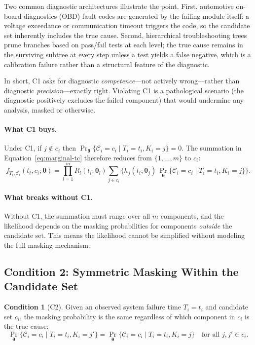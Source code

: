 \documentclass[11pt]{article}
\theoremstyle{definition}
\newtheorem{condition}{Condition}
\theoremstyle{plain}
\renewcommand{\v}[1]{\boldsymbol{#1}}
\newcommand{\btheta}{\v{\theta}}
\begin{document}
Two common diagnostic architectures illustrate the point.
First, automotive on-board diagnostics (OBD) fault codes are generated
by the failing module itself: a voltage exceedance or communication
timeout triggers the code, so the candidate set inherently includes the
true cause.
Second, hierarchical troubleshooting trees prune branches based on
pass/fail tests at each level; the true cause remains in the surviving
subtree at every step unless a test yields a false negative, which is a
calibration failure rather than a structural feature of the diagnostic.

In short, C1 asks for diagnostic \emph{competence}---not actively
wrong---rather than diagnostic \emph{precision}---exactly right.
Violating C1 is a pathological scenario (the diagnostic positively
excludes the failed component) that would undermine any analysis, masked
or otherwise.

\paragraph{What C1 buys.}
Under C1, if $j \notin c_i$ then
$\Pr_{\!\btheta}\{\mathcal{C}_i = c_i \mid T_i = t_i, K_i = j\} = 0$.
The summation in Equation~\eqref{eq:marginal-tc} therefore reduces from
$\{1, \ldots, m\}$ to $c_i$:
\begin{equation}
\label{eq:after-c1}
    f_{T_i, \mathcal{C}_i}(t_i, c_i; \btheta)
    = \prod_{l=1}^m R_l(t_i; \v{\theta}_l)
        \sum_{j \in c_i} \biggl\{
            h_j(t_i; \v{\theta}_j) \,
            \Pr_{\!\btheta}\{\mathcal{C}_i = c_i \mid T_i = t_i, K_i = j\}
        \biggr\}.
\end{equation}

\paragraph{What breaks without C1.}
Without C1, the summation must range over all $m$ components, and the
likelihood depends on the masking probabilities for components
\emph{outside} the candidate set.
This means the likelihood cannot be simplified without modeling the full
masking mechanism.

\subsection{Condition 2: Symmetric Masking Within the Candidate Set}
\label{sec:c2}

\begin{condition}[C2]
\label{cond:c2}
Given an observed system failure time $T_i = t_i$ and candidate set
$c_i$, the masking probability is the same regardless of which component
in $c_i$ is the true cause:
\begin{equation}
    \Pr_{\!\btheta}\{\mathcal{C}_i = c_i \mid T_i = t_i, K_i = j'\}
    = \Pr_{\!\btheta}\{\mathcal{C}_i = c_i \mid T_i = t_i, K_i = j\}
    \quad \text{for all } j, j' \in c_i.
\end{equation}
\end{condition}
\end{document}
